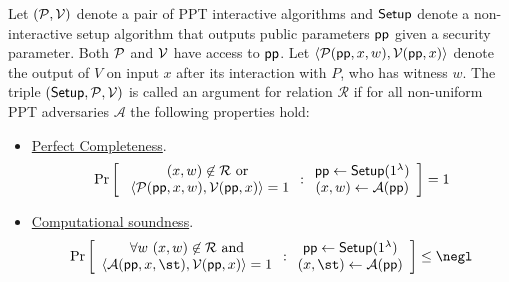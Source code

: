 \begin{definition} \label{def:argument}
Let $(\mathcal{P}, \mathcal{V})$ denote a pair of PPT interactive algorithms and $\textsf{{Setup}}$ denote a non-interactive setup algorithm that outputs public parameters $\textsf{pp}$ given a security parameter. Both $\mathcal{P}$ and $\mathcal{V}$ have access to $\textsf{pp}$. Let $\langle \mathcal{P}(\textsf{pp}, x, w), \mathcal{V}(\textsf{pp}, x) \rangle$ denote the output of $V$ on input $x$ after its interaction with $P$, who has witness $w$. The triple $(\textsf{{Setup}}, \mathcal{P}, \mathcal{V})$ is called an argument for relation $\mathcal{R}$ if for all non-uniform PPT adversaries $\mathcal{A}$ the following properties hold: 

\begin{itemize}
\item \underline{Perfect Completeness}. 
\[
\Pr \left[
\begin{array}{c}
        (x, w) \not \in  \mathcal{R} \ \text{or} \\
         \ \langle \mathcal{P}(\textsf{pp}, x, w), \mathcal{V}(\textsf{pp}, x) \rangle = 1 \\
\end{array}
:
\begin{array}{c}
             \textsf{pp} \leftarrow \textsf{{Setup}}(1^\lambda) \\
             (x, w) \leftarrow \mathcal{A}(\textsf{pp}) \\
\end{array} 
\right]  = 1 
 \]

\item \underline{Computational soundness}. 
\[
\Pr \left[
\begin{array}{c}
        \forall w \ (x, w) \not\in  \mathcal{R} \ \text{and} \\ 
         \langle \mathcal{A}(\params, x, \st), \verifier(\params, x) \rangle = 1 
\end{array}
:
\begin{array}{c}
             \params \leftarrow \textsf{Setup}(1^\lambda) \\
             (x, \st) \leftarrow \mathcal{A}(\params) \\
\end{array}
        \right] \leq \negl
\]
\end{itemize} 
\end{definition} 


